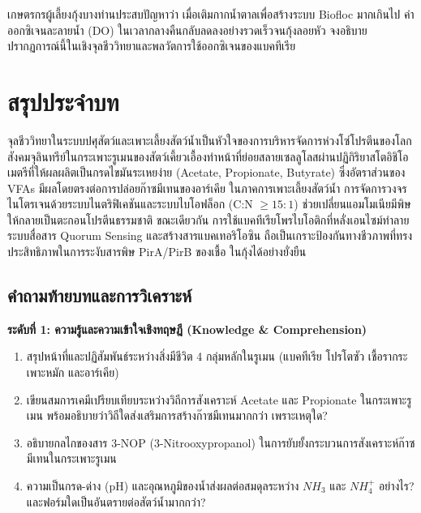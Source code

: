 \begin{insight}
เกษตรกรผู้เลี้ยงกุ้งบางท่านประสบปัญหาว่า เมื่อเติมกากน้ำตาลเพื่อสร้างระบบ Biofloc มากเกินไป ค่าออกซิเจนละลายน้ำ (DO) ในเวลากลางคืนกลับลดลงอย่างรวดเร็วจนกุ้งลอยหัว จงอธิบายปรากฏการณ์นี้ในเชิงจุลชีววิทยาและพลวัตการใช้ออกซิเจนของแบคทีเรีย
\end{insight}

\section*{สรุปประจำบท}

จุลชีววิทยาในระบบปศุสัตว์และเพาะเลี้ยงสัตว์น้ำเป็นหัวใจของการบริหารจัดการห่วงโซ่โปรตีนของโลก สังคมจุลินทรีย์ในกระเพาะรูเมนของสัตว์เคี้ยวเอื้องทำหน้าที่ย่อยสลายเซลลูโลสผ่านปฏิกิริยาสโตอิชิโอเมตรีที่ให้ผลผลิตเป็นกรดไขมันระเหยง่าย (Acetate, Propionate, Butyrate) ซึ่งอัตราส่วนของ VFAs มีผลโดยตรงต่อการปล่อยก๊าซมีเทนของอาร์เคีย ในภาคการเพาะเลี้ยงสัตว์น้ำ การจัดการวงจรไนโตรเจนด้วยระบบไนตริฟิเคชันและระบบไบโอฟล็อก (C:N $\ge 15:1$) ช่วยเปลี่ยนแอมโมเนียมีพิษให้กลายเป็นตะกอนโปรตีนธรรมชาติ ขณะเดียวกัน การใช้แบคทีเรียโพรไบโอติกที่หลั่งเอนไซม์ทำลายระบบสื่อสาร Quorum Sensing และสร้างสารแบคเทอริโอซิน ถือเป็นเกราะป้องกันทางชีวภาพที่ทรงประสิทธิภาพในการระงับสารพิษ PirA/PirB ของเชื้อ  ในกุ้งได้อย่างยั่งยืน

\subsection*{คำถามท้ายบทและการวิเคราะห์}

\noindent \textbf{ระดับที่ 1: ความรู้และความเข้าใจเชิงทฤษฎี (Knowledge \& Comprehension)}
\begin{enumerate}
    \item สรุปหน้าที่และปฏิสัมพันธ์ระหว่างสิ่งมีชีวิต 4 กลุ่มหลักในรูเมน (แบคทีเรีย โปรโตซัว เชื้อรากระเพาะหมัก และอาร์เคีย)
    \item เขียนสมการเคมีเปรียบเทียบระหว่างวิถีการสังเคราะห์ Acetate และ Propionate ในกระเพาะรูเมน พร้อมอธิบายว่าวิถีใดส่งเสริมการสร้างก๊าซมีเทนมากกว่า เพราะเหตุใด?
    \item อธิบายกลไกของสาร 3-NOP (3-Nitrooxypropanol) ในการยับยั้งกระบวนการสังเคราะห์ก๊าซมีเทนในกระเพาะรูเมน
    \item ความเป็นกรด-ด่าง (pH) และอุณหภูมิของน้ำส่งผลต่อสมดุลระหว่าง $NH_3$ และ $NH_4^+$ อย่างไร? และฟอร์มใดเป็นอันตรายต่อสัตว์น้ำมากกว่า?
\end{enumerate}

